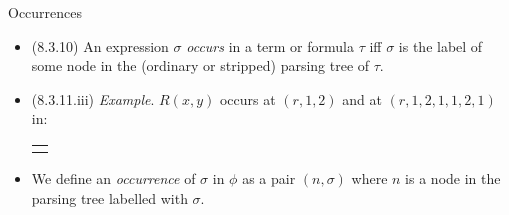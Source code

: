 \begin{frame}{Occurrences}

{\small
\begin{itemize}
	
		\item (8.3.10) An expression $\sigma$ \emph{occurs} in a term or formula $\tau$ iff $\sigma$ is the label of some node in the (ordinary or stripped) parsing tree of $\tau$.
	
	\item (8.3.11.iii) \emph{Example}. $R(x,y)$ occurs at $(r,1,2)$ and at $(r,1,2,1,1,2,1)$ in: 
\begin{center}{\tiny
\begin{tabular}{c}
\begin{tikzpicture}[level distance = 3em]
{\Tree [.$\forall x(R(x,y)\to \exists x\forall y(R(y,x)\land \neg R(x,y)))$
		[.$R(x,y)\to \exists x\forall y(R(y,x)\land \neg R(x,y))$ 
			[.\alert{$R(x,y)$} [.$x$ ] [.$y$ ] ]
			[.$\exists x\forall y(R(y,x)\land \neg R(x,y))$ 
				[.$\forall y(R(y,x)\land \neg R(x,y))$ 
					[.$R(y,x)\land \neg R(x,y)$ 
						[.$R(y,x)$
							[.$y$ ]
							[.$x$ ]
						]	
						[.$\neg R(x,y)$ 
							[.\alert{$R(x,y)$}
								[.$x$ ]
								[.$y$ ]
							]
						]
					]
				]
			]
		]
	]
}
\end{tikzpicture}
\end{tabular}}
\end{center}

	\item We define an \emph{occurrence} of $\sigma$ in $\phi$ as a pair $(n,\sigma)$ where $n$ is a node in the parsing tree labelled with $\sigma$.
	
	\end{itemize}
}

\end{frame}

